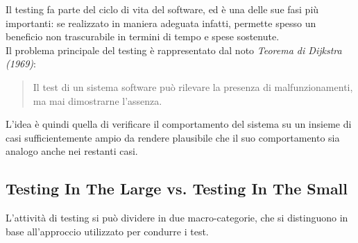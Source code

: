 Il testing fa parte del ciclo di vita del software, ed è una delle sue fasi più importanti: se realizzato in maniera adeguata infatti, permette spesso un beneficio non trascurabile in termini di tempo e spese sostenute.\\
Il problema principale del testing è rappresentato dal noto \emph{Teorema di Dijkstra (1969)}:\\ 
\begin{quote}
Il test di un sistema software può rilevare la presenza di malfunzionamenti, ma mai dimostrarne l'assenza.\\
\end{quote} 
L'idea è quindi quella di verificare il comportamento del sistema su un insieme di casi sufficientemente ampio da rendere plausibile che il suo comportamento sia analogo anche nei restanti casi.\\

\subsection{Testing In The Large vs. Testing In The Small}

L'attività di testing si può dividere in due macro-categorie, che si distinguono in base all'approccio utilizzato per condurre i test.

